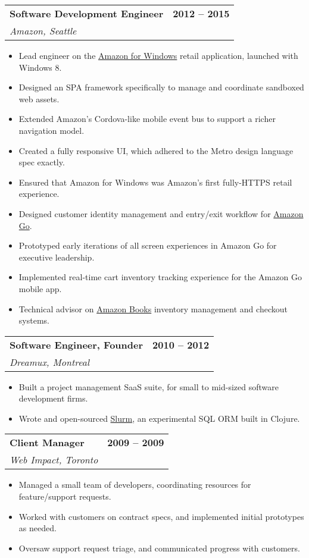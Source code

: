 \documentclass[12pt]{article}
\makeatletter
\newenvironment{justifycolumns}
{\begin{tabular*}{\textwidth}{@{\extracolsep{\fill}}lr@{}}}
{\end{tabular*}}
\newcommand{\row}[2]{#1 & #2 \\}
\newcommand{\rowheading}[2]{\row{\textbf{#1}}{\textbf{#2}}}
\newcommand{\range}[2]{#1 -- #2}
\newcommand{\blockseparation}{\vspace{0.15in}}
\newenvironment{tightbullets}
{\begin{itemize}}
{\end{itemize}}
\newenvironment{bullets}
{\begin{tightbullets}}
{\end{tightbullets} \blockseparation}
\makeatother
\begin{document}
\begin{flushleft}
\begin{justifycolumns}
	\rowheading{Software Development Engineer}{\range{2012}{2015}}
	\row{\emph{Amazon, Seattle}}{}
\end{justifycolumns}
\begin{bullets}
	\item Lead engineer on the \href{http://apps.microsoft.com/windows/en-us/app/amazon/80299018-3dee-418d-8466-374fe9463309}{Amazon for Windows} retail application, launched with Windows 8.
	\item Designed an SPA framework specifically to manage and coordinate sandboxed web assets.
	\item Extended Amazon’s Cordova-like mobile event bus to support a richer navigation model.
	\item Created a fully responsive UI, which adhered to the Metro design language spec exactly.
	\item Ensured that Amazon for Windows was Amazon's first fully-HTTPS retail experience.
	\item Designed customer identity management and entry/exit workflow for \href{https://www.amazon.com/b?ie=UTF8\&node=16008589011}{Amazon Go}.
	\item Prototyped early iterations of all screen experiences in Amazon Go for executive leadership.
	\item Implemented real-time cart inventory tracking experience for the Amazon Go mobile app.
	\item Technical advisor on \href{https://www.amazon.com/amazon-books-university-village-seattle-washington/b?ie=UTF8\&node=17750359011}{Amazon Books} inventory management and checkout systems.
\end{bullets}

\pagebreak

\begin{justifycolumns}
	\rowheading{Software Engineer, Founder}{\range{2010}{2012}}
	\row{\emph{Dreamux, Montreal}}{}
\end{justifycolumns}
\begin{bullets}
	\item Built a project management SaaS suite, for small to mid-sized software development firms.
	\item Wrote and open-sourced \href{https://github.com/amcnamara/slurm}{Slurm}, an experimental SQL ORM built in Clojure.
\end{bullets}

\begin{justifycolumns}
	\rowheading{Client Manager}{\range{2009}{2009}}
	\row{\emph{Web Impact, Toronto}}{}
\end{justifycolumns}
\begin{bullets}
	\item Managed a small team of developers, coordinating resources for feature/support requests.
	\item Worked with customers on contract specs, and implemented initial prototypes as needed.
	\item Oversaw support request triage, and communicated progress with customers.
\end{bullets}


\end{flushleft}
\end{document}
